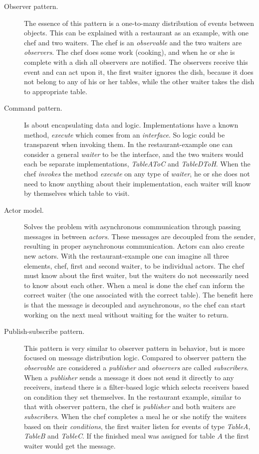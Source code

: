 \begin{description}
  \item[Observer pattern.] The essence of this pattern is a one-to-many distribution of events between objects.
    This can be explained with a restaurant as an example, with one chef and two waiters.
    The chef is an \emph{observable} and the two waiters are \emph{observers}.
    The chef does some work (cooking), and when he or she is complete with a dish all observers are notified.
    The observers receive this event and can act upon it, 
    \eg the first waiter ignores the dish, because it does not belong to any of his or her tables, 
    while the other waiter takes the dish to appropriate table.
  \item[Command pattern.] Is about encapsulating data and logic. 
    Implementations have a known method, \eg \emph{execute} which comes from an \emph{interface}.
    So logic could be transparent when invoking them.
    In the restaurant-example one can consider a general \emph{waiter} to be the interface,
    and the two waiters would each be separate implementations, 
    \eg \emph{TableAToC} and \emph{TableDToH}.
    When the chef \emph{invokes} the method \emph{execute} on any type of \emph{waiter}, 
    he or she does not need to know anything about their implementation, 
    each waiter will know by themselves which table to visit.
  \item[Actor model.] Solves the problem with asynchronous communication through passing messages
    in between \emph{actors}.
    These messages are decoupled from the sender, resulting in proper asynchronous communication.
    Actors can also create new actors.
    With the restaurant-example one can imagine all three elements, \ie chef, first and second waiter,
    to be individual actors.
    The chef must know about the first waiter, 
    but the waiters do not necessarily need to know about each other.
    When a meal is done the chef can inform the correct waiter 
    (the one associated with the correct table).
    The benefit here is that the message is decoupled and asynchronous, so the chef can start
    working on the next meal without waiting for the waiter to return.
  \item[Publish-subscribe pattern.] This pattern is very similar to observer pattern in behavior,
    but is more focused on message distribution logic.
    Compared to observer pattern the \emph{observable} are considered a \emph{publisher} and
    \emph{observers} are called \emph{subscribers}.
    When a \emph{publisher} sends a message it does not send it directly to any receivers,
    instead there is a filter-based logic which selects receivers based on condition they set themselves.
    In the restaurant example, similar to that with observer pattern, the chef is \emph{publisher}
    and both waiters are \emph{subscribers}.
    When the chef completes a meal he or she notify the waiters based on their \emph{conditions},
    \eg the first waiter listen for events of type \emph{TableA}, \emph{TableB} and \emph{TableC}.
    If the finished meal was assigned for table $A$ the first waiter would get the message.
\end{description}
